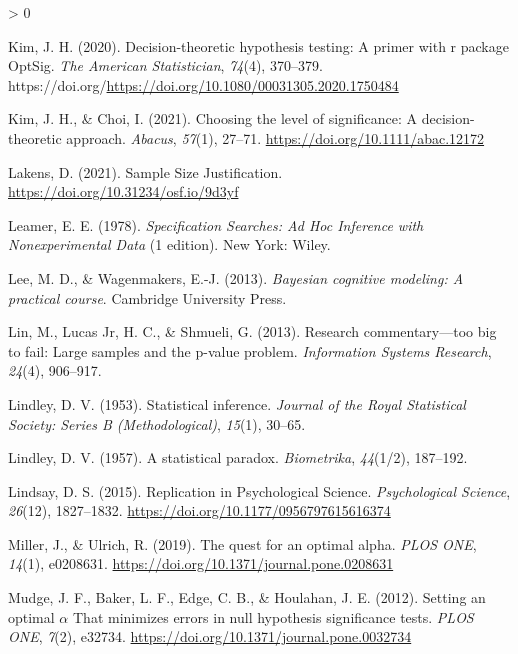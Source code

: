 \documentclass[
  english,
  ,man, a4paper,floatsintext]{apa6}
\newlength{\cslhangindent}
\newenvironment{CSLReferences}[2] %
 {%
  \setlength{\parindent}{0pt}
  \ifodd #1 \everypar{\setlength{\hangindent}{\cslhangindent}}\ignorespaces\fi
  \ifnum #2 > 0
  \setlength{\parskip}{#2\baselineskip}
  \fi
 }%
 {}
\begin{document}
\begin{CSLReferences}{1}{0}
\leavevmode\hypertarget{ref-kim2020decision}{}%
Kim, J. H. (2020). Decision-theoretic hypothesis testing: A primer with r package OptSig. \emph{The American Statistician}, \emph{74}(4), 370--379. https://doi.org/\url{https://doi.org/10.1080/00031305.2020.1750484}

\leavevmode\hypertarget{ref-kim2021choosing}{}%
Kim, J. H., \& Choi, I. (2021). Choosing the level of significance: A decision-theoretic approach. \emph{Abacus}, \emph{57}(1), 27--71. \url{https://doi.org/10.1111/abac.12172}

\leavevmode\hypertarget{ref-lakens_sample_2021}{}%
Lakens, D. (2021). Sample {Size} {Justification}. \url{https://doi.org/10.31234/osf.io/9d3yf}

\leavevmode\hypertarget{ref-leamer_specification_1978}{}%
Leamer, E. E. (1978). \emph{Specification {Searches}: {Ad Hoc Inference} with {Nonexperimental Data}} (1 edition). {New York}: {Wiley}.

\leavevmode\hypertarget{ref-LeeWagenmakersBayesBook}{}%
Lee, M. D., \& Wagenmakers, E.-J. (2013). \emph{Bayesian cognitive modeling: {A} practical course}. Cambridge University Press.

\leavevmode\hypertarget{ref-lin2013research}{}%
Lin, M., Lucas Jr, H. C., \& Shmueli, G. (2013). Research commentary---too big to fail: Large samples and the p-value problem. \emph{Information Systems Research}, \emph{24}(4), 906--917.

\leavevmode\hypertarget{ref-lindley1953statistical}{}%
Lindley, D. V. (1953). Statistical inference. \emph{Journal of the Royal Statistical Society: Series B (Methodological)}, \emph{15}(1), 30--65.

\leavevmode\hypertarget{ref-lindley_statistical_1957}{}%
Lindley, D. V. (1957). A statistical paradox. \emph{Biometrika}, \emph{44}(1/2), 187--192.

\leavevmode\hypertarget{ref-lindsay_2015}{}%
Lindsay, D. S. (2015). Replication in {Psychological Science}. \emph{Psychological Science}, \emph{26}(12), 1827--1832. \url{https://doi.org/10.1177/0956797615616374}

\leavevmode\hypertarget{ref-miller_quest_2019}{}%
Miller, J., \& Ulrich, R. (2019). The quest for an optimal alpha. \emph{PLOS ONE}, \emph{14}(1), e0208631. \url{https://doi.org/10.1371/journal.pone.0208631}

\leavevmode\hypertarget{ref-mudge_setting_2012}{}%
Mudge, J. F., Baker, L. F., Edge, C. B., \& Houlahan, J. E. (2012). Setting an optimal {\(\alpha\)} {That minimizes errors} in {null hypothesis significance tests}. \emph{PLOS ONE}, \emph{7}(2), e32734. \url{https://doi.org/10.1371/journal.pone.0032734}


\end{CSLReferences}
\end{document}
